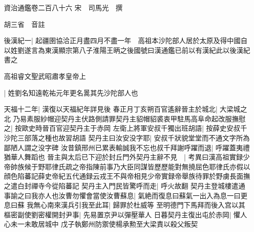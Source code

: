 資治通鑑卷二百八十六
宋　司馬光　撰

胡三省　音註

後漢紀一|{
	起疆圉協洽正月盡四月不盡一年　高祖本沙陀部人居於太原及得中國自以姓劉遂言為東漢顯宗第八子淮陽王昞之後國號曰漢通鑑已前以有漢紀此以後漢紀書之}


高祖睿文聖武昭肅孝皇帝上

|{
	姓劉名知遠乾祐元年更名暠其先沙陀部人也}


天福十二年|{
	漢復以天福紀年詳見後}
春正月丁亥朔百官遙辭晉主於城北|{
	大梁城之北}
乃易素服紗帽迎契丹主伏路側請罪契丹主貂帽貂裘衷甲駐馬高阜命起改服撫慰之|{
	按歐史時晉百官迎契丹主于赤岡}
左衛上將軍安叔千獨出班胡語|{
	按薛史安叔千沙陀三部落之種也故習胡語}
契丹主曰汝安没字耶|{
	安叔千狀貌堂堂而不通文字所為鄙陋人謂之没字碑}
汝昔鎮邢州已累表輸誠我不忘也叔千拜謝呼躍而退|{
	呼躍蓋夷禮猶華人舞蹈也}
晉主與太后已下迎於封丘門外契丹主辭不見　|{
	考異曰漢高祖實録少帝帥族候于野耶律氏疏之帝指陳前事乃大臣同謀皆歷歷能對無撓屈色耶律氏亦假以顔色陷蕃記薛史帝紀五代通録云戎王不與帝相見少帝實録帝舉族待罪於野虜長面撫之遣白封禪寺今從陷蕃記}
契丹主入門民皆驚呼而走|{
	呼火故翻}
契丹主登城樓遣通事諭之曰我亦人也汝曹勿懼會當使汝曹蘇息|{
	氣絶而復息曰蘇氣一出入為息一曰更息曰蘇}
我無心南來漢兵引我至此耳|{
	歸罪於杜威等}
至明德門下馬拜而後入宫以其樞密副使劉密權開封尹事|{
	先易置京尹以彈壓華人}
日暮契丹主復出屯於赤岡|{
	懼人心未一未敢居城中}
戊子執鄭州防禦使楊承勲至大梁責以殺父叛契

